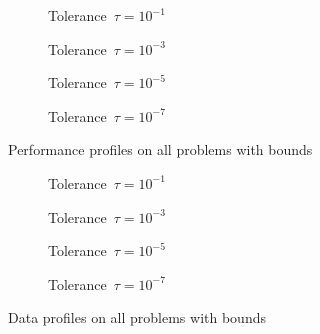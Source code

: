 \begin{figure}[ht]
    \centering
    \begin{subfigure}[b]{0.49\textwidth}
        \centering
        \caption{Tolerance~$\tau = 10^{-1}$}
    \end{subfigure}
    \hfill
    \begin{subfigure}[b]{0.49\textwidth}
        \centering
        \caption{Tolerance~$\tau = 10^{-3}$}
    \end{subfigure}
    \begin{subfigure}[b]{0.49\textwidth}
        \centering
        \caption{Tolerance~$\tau = 10^{-5}$}
    \end{subfigure}
    \hfill
    \begin{subfigure}[b]{0.49\textwidth}
        \centering
        \caption{Tolerance~$\tau = 10^{-7}$}
    \end{subfigure}
    \caption{Performance profiles on all problems with bounds}
    \label{fig:perf-all-problems-bounds}
\end{figure}

\begin{figure}[ht]
    \centering
    \begin{subfigure}[b]{0.49\textwidth}
        \centering
        \caption{Tolerance~$\tau = 10^{-1}$}
    \end{subfigure}
    \hfill
    \begin{subfigure}[b]{0.49\textwidth}
        \centering
        \caption{Tolerance~$\tau = 10^{-3}$}
    \end{subfigure}
    \begin{subfigure}[b]{0.49\textwidth}
        \centering
        \caption{Tolerance~$\tau = 10^{-5}$}
    \end{subfigure}
    \hfill
    \begin{subfigure}[b]{0.49\textwidth}
        \centering
        \caption{Tolerance~$\tau = 10^{-7}$}
    \end{subfigure}
    \caption{Data profiles on all problems with bounds}
    \label{fig:data-all-problems-bounds}
\end{figure}

